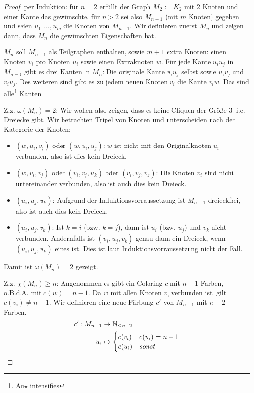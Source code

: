 \documentclass[../main.tex]{subfiles}
\begin{document}
\begin{proof}
    per Induktion: für $n = 2$ erfüllt der Graph $M_2 := K_2$ mit 2 Knoten und einer Kante das gewünschte.
    für $n > 2$ sei also $M_{n-1}$ (mit $m$ Knoten) gegeben und seien $u_1, \hdots, u_m$ die Knoten von $M_{n-1}$. Wir definieren zuerst $M_n$ und zeigen dann, dass $M_n$ die gewünschten Eigenschaften hat.

    $M_n$ soll $M_{n-1}$ als Teilgraphen enthalten, sowie $m+1$ extra Knoten: einen Knoten $v_i$ pro Knoten $u_i$ sowie einen Extraknoten $w$. Für jede Kante $u_iu_j$ in $M_{n-1}$ gibt es drei Kanten in $M_n$: Die originale Kante $u_iu_j$ selbst sowie $u_iv_j$ und $v_iu_j$. Des weiteren sind gibt es zu jedem neuen Knoten $v_i$ die Kante $v_iw$. Das sind alle\footnote{Au$\star$ intensifies} Kanten.
    
    Z.z. $\omega(M_n) = 2$: Wir wollen also zeigen, dass es keine Cliquen der Größe 3, i.e. Dreiecke gibt. Wir betrachten Tripel von Knoten und unterscheiden nach der Kategorie der Knoten:
    \begin{itemize}
        \item $(w, u_i, v_j)$ oder $(w, u_i, u_j)$: $w$ ist nicht mit den Originalknoten $u_i$ verbunden, also ist dies kein Dreieck.
        \item $(w, v_i, v_j)$ oder $(v_i, v_j, u_k)$ oder $(v_i, v_j, v_k)$: Die Knoten $v_i$ sind nicht untereinander verbunden, also ist auch dies kein Dreieck.
        \item $(u_i, u_j, u_k)$: Aufgrund der Induktionsvorraussetzung ist $M_{n-1}$ dreieckfrei, also ist auch dies kein Dreieck.
        \item $(u_i, u_j, v_k)$: Ist $k=i$ (bzw. $k=j$), dann ist $u_i$ (bzw. $u_j$) und $v_k$ nicht verbunden. Andernfalls ist $(u_i, u_j, v_k)$ genau dann ein Dreieck, wenn $(u_i, u_j, u_k)$ eines ist. Dies ist laut Induktionsvorraussetzung nicht der Fall.
    \end{itemize}
    Damit ist $\omega(M_n) = 2$ gezeigt.

    Z.z. $\chi(M_n) \geq n$: Angenommen es gibt ein Coloring $c$ mit $n-1$ Farben, o.B.d.A. mit $c(w) = n-1$. Da $w$ mit allen Knoten $v_i$ verbunden ist, gilt $c(v_i) \neq n-1$. Wir definieren eine neue Färbung $c'$ von $M_{n-1}$ mit $n-2$ Farben.
    \begin{align*}
        c' : M_{n-1} &\to \mathbb{N}_{\leq n-2} \\
        u_i &\mapsto \begin{cases}
            c(v_i) &c(u_i) = n-1 \\
            c(u_i) &sonst
        \end{cases}
    \end{align*}


\end{proof}
\end{document}
